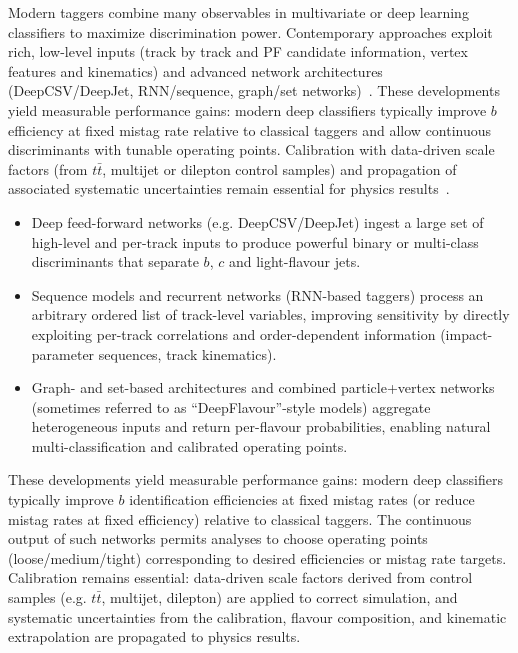 Modern taggers combine many observables in multivariate or deep learning classifiers to maximize discrimination power. Contemporary approaches exploit rich, low-level inputs (track by track and PF candidate information, vertex features and kinematics) and advanced network architectures (DeepCSV/DeepJet, RNN/sequence, graph/set networks)~\cite{CMS_BTV2016,Bols_2020,ATLAS:2022fgo}. These developments yield measurable performance gains: modern deep classifiers typically improve $b$ efficiency at fixed mistag rate relative to classical taggers and allow continuous discriminants with tunable operating points. Calibration with data-driven scale factors (from $t\bar t$, multijet or dilepton control samples) and propagation of associated systematic uncertainties remain essential for physics results~\cite{CMS_BTV2016}.


\begin{itemize}
  \item Deep feed-forward networks (e.g. DeepCSV/DeepJet) ingest a large set of high-level and per-track inputs to produce powerful binary or multi-class discriminants that separate $b$, $c$ and light-flavour jets.
  \item Sequence models and recurrent networks (RNN-based taggers) process an arbitrary ordered list of track-level variables, improving sensitivity by directly exploiting per-track correlations and order-dependent information (impact-parameter sequences, track kinematics).
  \item Graph- and set-based architectures and combined particle+vertex networks (sometimes referred to as ``DeepFlavour''-style models) aggregate heterogeneous inputs and return per-flavour probabilities, enabling natural multi-classification and calibrated operating points.
\end{itemize}

These developments yield measurable performance gains: modern deep classifiers typically improve $b$ identification efficiencies at fixed mistag rates (or reduce mistag rates at fixed efficiency) relative to classical taggers. The continuous output of such networks permits analyses to choose operating points (loose/medium/tight) corresponding to desired efficiencies or mistag rate targets. Calibration remains essential: data-driven scale factors derived from control samples (e.g. $t\bar t$, multijet, dilepton) are applied to correct simulation, and systematic uncertainties from the calibration, flavour composition, and kinematic extrapolation are propagated to physics results.

